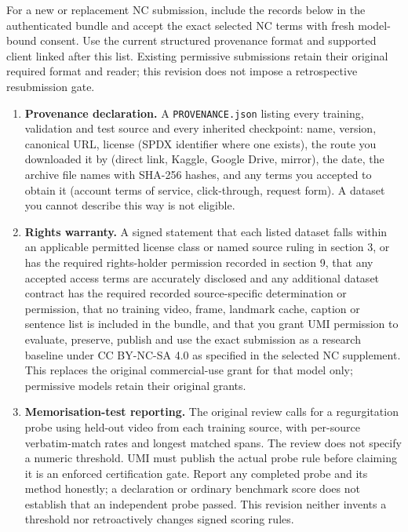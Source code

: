 \documentclass[10pt,a4paper]{article}
\providecommand{\tightlist}{\setlength{\itemsep}{0pt}\setlength{\parskip}{0pt}}
\begin{document}
For a new or replacement NC submission, include the records below in the
authenticated bundle and accept the exact selected NC terms with fresh
model-bound consent. Use the current structured provenance format and
supported client linked after this list. Existing permissive submissions
retain their original required format and reader; this revision does not
impose a retrospective resubmission gate.

\begin{enumerate}
\def\labelenumi{\arabic{enumi}.}
\tightlist
\item
  \textbf{Provenance declaration.} A \texttt{PROVENANCE.json} listing
  every training, validation and test source and every inherited
  checkpoint: name, version, canonical URL,
  license (SPDX identifier where one exists), the route you downloaded
  it by (direct link, Kaggle, Google Drive, mirror), the date, the
  archive file names with SHA-256 hashes, and any terms you accepted to
  obtain it (account terms of service, click-through, request form). A
  dataset you cannot describe this way is not eligible.
\item
  \textbf{Rights warranty.} A signed statement that each listed dataset
  falls within an applicable permitted license class or named source
  ruling in section 3, or has the required rights-holder permission
  recorded in section 9, that any accepted access terms are accurately
  disclosed and any additional dataset contract has the required
  recorded source-specific determination or permission, that no training video, frame, landmark cache,
  caption or sentence list is included in the bundle, and that you grant
  UMI permission to evaluate, preserve, publish and use the exact
  submission as a research baseline under CC BY-NC-SA 4.0 as specified
  in the selected NC supplement. This replaces the original
  commercial-use grant for that model only; permissive models retain
  their original grants.
\item
  \textbf{Memorisation-test reporting.} The original review calls for a
  regurgitation probe using held-out video from each training source,
  with per-source verbatim-match rates and longest matched spans. The
  review does not specify a numeric threshold. UMI must publish the
  actual probe rule before claiming it is an enforced certification
  gate. Report any completed probe and its method honestly; a
  declaration or ordinary benchmark score does not establish that an
  independent probe passed. This revision neither invents a threshold
  nor retroactively changes signed scoring rules.

\end{enumerate}
\end{document}
